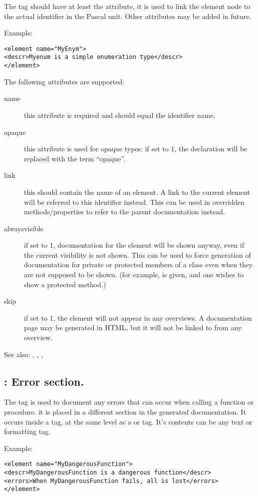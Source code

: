 The  tag should have at least the  attribute, it 
is used to link the element node to the actual identifier in the Pascal unit.
Other attributes may be added in future.

Example:
\begin{verbatim}
<element name="MyEnym">
<descr>Myenum is a simple enumeration type</descr>
</element>
\end{verbatim}

The following attributes are supported:
\begin{description}
\item [name] this attribute is required and should equal the identifier name.
\item [opaque] this attribute is used for opaque types: if set to 1, the declaration will be replaced with the term ``opaque''.
\item [link] this should contain the name of an element. A link to the current element will be referred to this identifier instead. 
This can be used in overridden methods/properties to refer to the parent documentation instead.
\item [alwaysvisible] if set to 1, documentation for the element will be shown anyway, even if the current visibility is not shown. 
This can be used to force generation of documentation for private or protected members of a class even when they are not supposed to be shown. 
(for example,  is given, and one wishes to show a protected method.)
\item[skip] if set to 1, the element will not appear in any overviews. 
A documentation page may be generated in HTML, but it will not be linked to from any overview.
\end{description}


See also: , , , 

\subsection{ : Error section.}
\label{tag:errors}
The  tag is used to document any errors that can occur when
calling a function or procedure. it is placed in a different section in the
generated documentation. It occurs inside a  tag, at the same
level as a  or  tag. It's contents can be any
text or formatting tag.

Example:
\begin{verbatim}
<element name="MyDangerousFunction">
<descr>MyDangerousFunction is a dangerous function</descr>
<errors>When MyDangerousFunction fails, all is lost</errors>
</element>
\end{verbatim}

